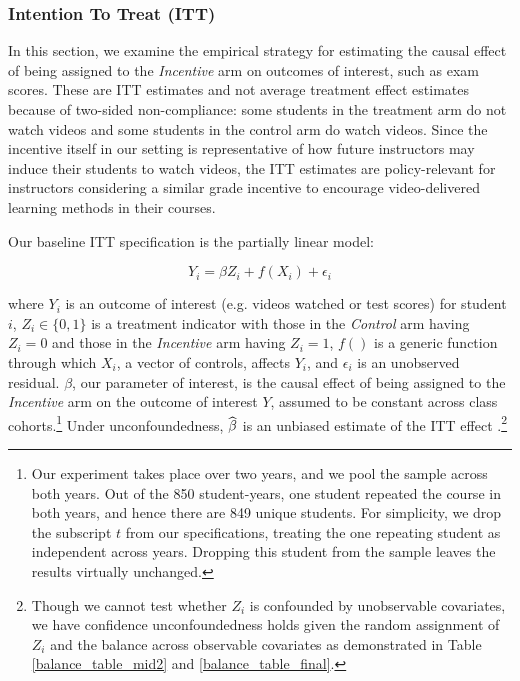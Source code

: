 \documentclass[12pt]{article}
\newcommand\wh[1]{\hstretch{2}{\hat{\hstretch{.5}{#1}}}}
\begin{document}
\subsubsection{Intention To Treat (ITT)}

In this section, we examine the empirical strategy for estimating the causal effect of being assigned to the \textit{Incentive} arm on outcomes of interest, such as exam scores. These are ITT estimates and not average treatment effect estimates because of two-sided non-compliance: some students in the treatment arm do not watch videos and some students in the control arm do watch videos. Since the incentive itself in our setting is representative of how future instructors may induce their students to watch videos, the ITT estimates are policy-relevant for instructors considering a similar grade incentive to encourage video-delivered learning methods in their courses.

Our baseline ITT specification is the partially linear model:

\begin{equation} \label{itt_spec}
	Y_i = \beta Z_i + f(X_i) + \epsilon_i
\end{equation}

where $Y_i$ is an outcome of interest (e.g. videos watched or test scores) for student $i$, $Z_i \in \{0,1\}$ is a treatment indicator with those in the \textit{Control} arm having $Z_i=0$ and those in the \textit{Incentive} arm having $Z_i=1$, $f()$ is a generic function through which $X_i$, a vector of controls, affects $Y_i$, and $\epsilon_i$ is an unobserved residual. $\beta$, our parameter of interest, is the causal effect of being assigned to the \textit{Incentive} arm on the outcome of interest $Y$, assumed to be constant across class cohorts.\footnote{Our experiment takes place over two years, and we pool the sample across both years. Out of the 850 student-years, one student repeated the course in both years, and hence there are 849 unique students. For simplicity, we drop the subscript $t$ from our specifications, treating the one repeating student as independent across years. Dropping this student from the sample leaves the results virtually unchanged.} Under unconfoundedness, $\wh{\beta}$ is an unbiased estimate of the ITT effect \parencite{ir2015}.\footnote{Though we cannot test whether $Z_i$ is confounded by unobservable covariates, we have confidence unconfoundedness holds given the random assignment of $Z_i$ and the balance across observable covariates as demonstrated in Table \ref{balance_table_mid2} and \ref{balance_table_final}.}
\end{document}
